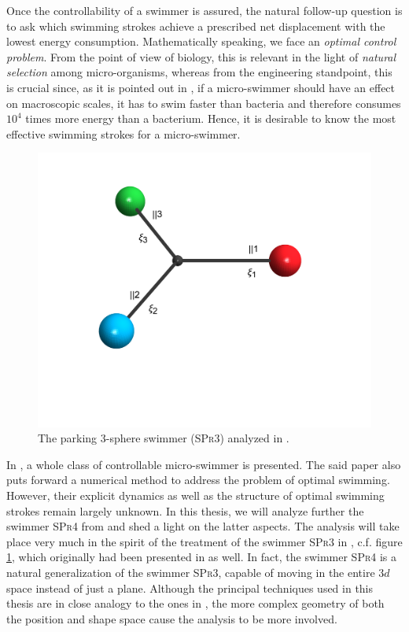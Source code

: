 Once the controllability of a swimmer is assured, the natural follow-up question is to ask which swimming strokes achieve a prescribed net displacement with the lowest energy consumption. Mathematically speaking, we face an \emph{optimal control problem}. From the point of view of biology, this is relevant in the light of \emph{natural selection} among micro-organisms, whereas from the engineering standpoint, this is crucial since, as it is pointed out in \cite{Avron2004}, if a micro-swimmer should have an effect on macroscopic scales, it has to swim faster than bacteria and therefore consumes $10^4$ times more energy than a bacterium. Hence, it is desirable to know the most effective swimming strokes for a micro-swimmer.

\begin{figure}[h]
\centering
	\includegraphics[scale=0.5]{images/spr3.png}
    \caption{The parking 3-sphere swimmer (\textsc{SPr3}) analyzed in \cite{Alouges2017}.}
    \label{fig:spr3}
\end{figure}

In \cite{Alouges2013}, a whole class of controllable micro-swimmer is presented. The said paper also puts forward a numerical method to address the problem of optimal swimming. However, their explicit dynamics as well as the structure of optimal swimming strokes remain largely unknown. In this thesis, we will analyze further the swimmer \textsc{SPr4} from \cite{Alouges2013} and shed a light on the latter aspects. The analysis will take place very much in the spirit of the treatment of the swimmer \textsc{SPr3} in \cite{Alouges2017}, c.f. figure \ref{fig:spr3}, which originally had been presented in \cite{Alouges2013} as well. In fact, the swimmer \textsc{SPr4} is a natural generalization of the swimmer \textsc{SPr3}, capable of moving in the entire $3d$ space instead of just a plane. Although the principal techniques used in this thesis are in close analogy to the ones in \cite{Alouges2017}, the more complex geometry of both the position and shape space cause the analysis to be more involved.

